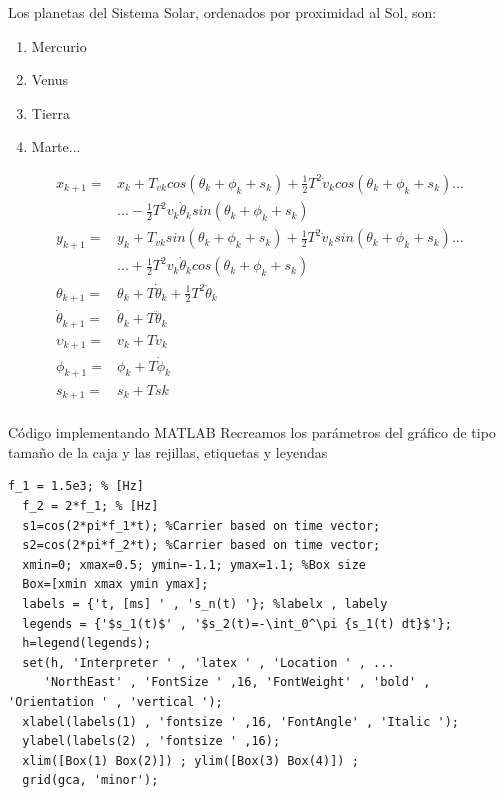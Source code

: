 \documentclass[conference,compsoc,onecolumn]{IEEEtran}
\begin{document}
Los planetas del Sistema Solar, ordenados por proximidad al Sol, son:
\begin{enumerate}
    \item Mercurio
    \item Venus
    \item Tierra
    \item Marte...
\end{enumerate}
\begin{equation}\label{eq_ej}
\begin{split} 
x_{k+1}  = & x_{k}+ T_{v k} cos(\theta_{k} + \phi_{k} + s_{k}) +\frac{1}{2}T^{2}\dot{v}_{k}cos(\theta_{k} + \phi_{k} + s_{k})...\\
& ...-\frac{1}{2}T^{2}v_{k}\dot{\theta}_{k}sin(\theta_{k} + \phi_{k} + s_{k})\\
y_{k+1} = & y_{k}+ T_{v k}sin(\theta_{k} + \phi_{k} + s_{k}) +\frac{1}{2}T^{2}\dot{v}_{k}sin(\theta_{k} + \phi_{k} + s_{k})...\\  
&...+\frac{1}{2}T^{2}v_{k}\dot{\theta}_{k}cos(\theta_{k} + \phi_{k} + s_{k})\\
\theta_{k+1}= & \theta_{k} + T \dot{\theta}_{k}+ \frac{1}{2}T^{2}\ddot{\theta}_{k}\\
\dot{\theta}_{k+1}= & \dot{\theta}_{k} + T\ddot{\theta}_{k}\\
\upsilon_{k+1}= &v_{k} + T \dot{v}_{ k}\\ 
\phi_{k+1}= &\phi_{k} + T \dot{\phi} _{k}\\ 
s_{k+1}= & s_{k} + T\dot{s} {k}\\ 
\end{split}
\end{equation}


Código implementando MATLAB Recreamos los parámetros del gráfico de tipo tamaño de la caja y las rejillas,
etiquetas y leyendas

\lstset{language=Matlab, breaklines=true, basicstyle=\footnotesize}
\lstset{numbers=left, numberstyle=\tiny, stepnumber=1, numbersep=-2pt}
\begin{lstlisting}[frame=single]
  f_1 = 1.5e3; % [Hz]
  f_2 = 2*f_1; % [Hz]
  s1=cos(2*pi*f_1*t); %Carrier based on time vector; 
  s2=cos(2*pi*f_2*t); %Carrier based on time vector; 
  xmin=0; xmax=0.5; ymin=-1.1; ymax=1.1; %Box size 
  Box=[xmin xmax ymin ymax]; 
  labels = {'t, [ms] ' , 's_n(t) '}; %labelx , labely 
  legends = {'$s_1(t)$' , '$s_2(t)=-\int_0^\pi {s_1(t) dt}$'}; 
  h=legend(legends); 
  set(h, 'Interpreter ' , 'latex ' , 'Location ' , ... 
     'NorthEast' , 'FontSize ' ,16, 'FontWeight' , 'bold' , 'Orientation ' , 'vertical '); 
  xlabel(labels(1) , 'fontsize ' ,16, 'FontAngle' , 'Italic '); 
  ylabel(labels(2) , 'fontsize ' ,16); 
  xlim([Box(1) Box(2)]) ; ylim([Box(3) Box(4)]) ; 
  grid(gca, 'minor');
\end{lstlisting}


\nocite{*}

\label{sec:biblio}
% 





\end{document}
